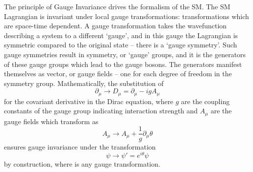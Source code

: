 The principle of Gauge Invariance drives the formalism of the \ac{SM}. 
The \ac{SM} Lagrangian is invariant under local gauge transformations: transformations which are space-time dependent.
A gauge transformation takes the wavefunction describing a system to a different `gauge', and in this gauge the Lagrangian is symmetric compared to the original state -- there is a `gauge symmetry'.
Such gauge symmetries result in symmetry, or `gauge' groups, and it is the generators of these gauge groups which lead to the gauge bosons.
The generators manifest themselves as vector, or gauge fields -- one for each degree of freedom in the symmetry group. 
Mathematically, the substitution of 
\begin{equation}
\partial_{\mu} \rightarrow D_{\mu} = \partial_{\mu} - i g A_{\mu}
\label{eq:covariant}
\end{equation}
for the covariant derivative in the Dirac equation, where $g$ are the coupling constants of the gauge group indicating interaction strength and $A_{\mu}$ are the gauge fields which transform as
\begin{equation}
A_{\mu} \rightarrow A_{\mu} + \frac{1}{g}\partial_{\mu}\theta
\label{Amugaugetransform}
\end{equation}
 ensures gauge invariance under the transformation
\begin{equation}
\psi \rightarrow \psi' = e^{i \theta} \psi
\label{u1gaugetransform}
\end{equation}
by construction, where \theta is any gauge transformation.


